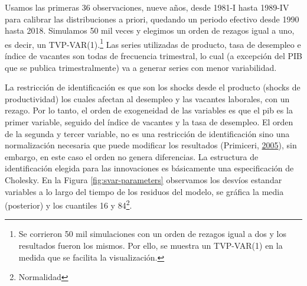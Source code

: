 \documentclass[12pt,oneside]{reedthesis}
\begin{document}
Usamos las primeras 36 observaciones, nueve años, desde 1981-I hasta 1989-IV para calibrar las distribuciones a priori, quedando un periodo efectivo desde 1990 hasta 2018. Simulamos 50 mil veces y elegimos un orden de rezagos igual a uno, es decir, un TVP-VAR(1).\footnote{Se corrieron 50 mil simulaciones con un orden de rezagos igual a dos y los resultados fueron los mismos. Por ello, se muestra un TVP-VAR(1) en la medida que se facilita la visualización.} Las series utilizadas de producto, tasa de desempleo e índice de vacantes son todas de frecuencia trimestral, lo cual (a excepción del PIB que se publica trimestralmente) va a generar series con menor variabilidad.

La restricción de identificación es que son los shocks desde el producto (shocks de productividad) los cuales afectan al desempleo y las vacantes laborales, con un rezago. Por lo tanto, el orden de exogeneidad de las variables es que el pib es la primer variable, seguido del índice de vacantes y la tasa de desempleo. El orden de la segunda y tercer variable, no es una restricción de identificación sino una normalización necesaria que puede modificar los resultados (Primiceri, \protect\hyperlink{ref-Primiceri2005}{2005}), sin embargo, en este caso el orden no genera diferencias. La estructura de identificación elegida para las innovaciones es básicamente una especificación de Cholesky. En la Figura \ref{fig:svar-parameters} observamos los desvíos estandar variables a lo largo del tiempo de los residuos del modelo, se gráfica la media (posterior) y los cuantiles 16 y 84\footnote{Normalidad}.
\end{document}
